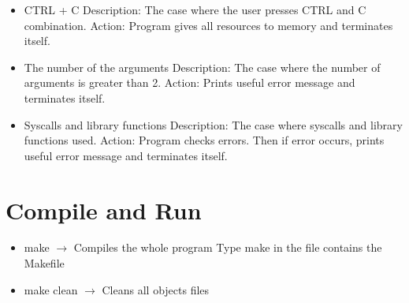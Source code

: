 \documentclass{article}
\begin{document}
\begin{itemize}
\item CTRL + C
\newline
Description: The case where the user presses CTRL and C combination.
\newline
Action: Program gives all resources to memory and terminates itself.

\item The number of the arguments
\newline
Description: The case where the number of arguments is greater than 2.
\newline
Action: Prints useful error message and terminates itself.

\item Syscalls and library functions
\newline
Description: The case where syscalls and library functions used.
\newline
Action: Program checks errors. Then if error occurs, prints useful error message and terminates itself.
\newline

\end{itemize}

\section{Compile and Run}

\begin{itemize}
    \item make $\rightarrow$ Compiles the whole program
    \newline
    Type make in the file contains the Makefile
    \item make clean $\rightarrow$ Cleans all objects files
\end{itemize}
\end{document}

